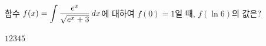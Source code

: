 함수 $f(x)=\displaystyle\int\dfrac{e^x}{\sqrt{e^x+3}}\mkern3mu dx$에 대하여 $f(0)=1$일 때, $f(\ln 6)$의 값은?
\begin{choices32}{$1$}{$2$}{$3$}{$4$}{$5$}\end{choices32}
